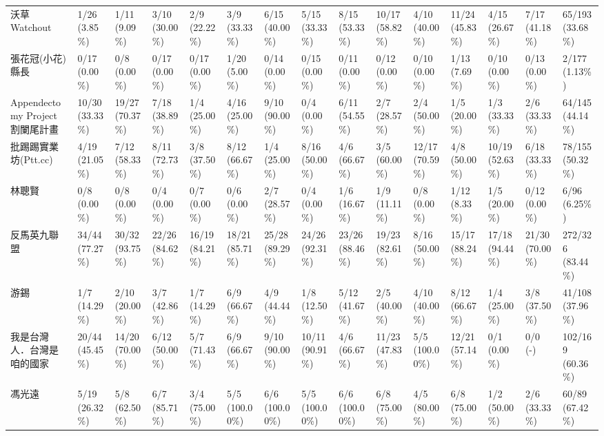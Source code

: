\documentclass[a4paper, 10pt, conference]{ieeeconf}       %
\begin{document}
\begin{CJK}{UTF8}{bsmi}
\begin{landscape}
\begin{longtable}[c]{@{}L{2.45cm}L{1.1cm}L{1.1cm}L{1.1cm}L{1.1cm}L{1.1cm}L{1.1cm}L{1.1cm}L{1.1cm}L{1.1cm}L{1.1cm}L{1.1cm}L{1.1cm}L{1.1cm}L{1.1cm}@{}}
沃草 Watchout & 1/26 (3.85\%) & 1/11 (9.09\%) & 3/10 (30.00\%) & 2/9 (22.22\%) & 3/9 (33.33\%) & 6/15 (40.00\%) & 5/15 (33.33\%) & 8/15 (53.33\%) & 10/17 (58.82\%) & 4/10 (40.00\%) & 11/24 (45.83\%) & 4/15 (26.67\%) & 7/17 (41.18\%) & 65/193 (33.68\%) \\
張花冠(小花)縣長 & 0/17 (0.00\%) & 0/8 (0.00\%) & 0/17 (0.00\%) & 0/17 (0.00\%) & 1/20 (5.00\%) & 0/14 (0.00\%) & 0/15 (0.00\%) & 0/11 (0.00\%) & 0/12 (0.00\%) & 0/10 (0.00\%) & 1/13 (7.69\%) & 0/10 (0.00\%) & 0/13 (0.00\%) & 2/177 (1.13\%) \\
Appendectomy Project 割闌尾計畫 & 10/30 (33.33\%) & 19/27 (70.37\%) & 7/18 (38.89\%) & 1/4 (25.00\%) & 4/16 (25.00\%) & 9/10 (90.00\%) & 0/4 (0.00\%) & 6/11 (54.55\%) & 2/7 (28.57\%) & 2/4 (50.00\%) & 1/5 (20.00\%) & 1/3 (33.33\%) & 2/6 (33.33\%) & 64/145 (44.14\%) \\
批踢踢實業坊(Ptt.cc) & 4/19 (21.05\%) & 7/12 (58.33\%) & 8/11 (72.73\%) & 3/8 (37.50\%) & 8/12 (66.67\%) & 1/4 (25.00\%) & 8/16 (50.00\%) & 4/6 (66.67\%) & 3/5 (60.00\%) & 12/17 (70.59\%) & 4/8 (50.00\%) & 10/19 (52.63\%) & 6/18 (33.33\%) & 78/155 (50.32\%) \\
林聰賢 & 0/8 (0.00\%) & 0/8 (0.00\%) & 0/4 (0.00\%) & 0/7 (0.00\%) & 0/6 (0.00\%) & 2/7 (28.57\%) & 0/4 (0.00\%) & 1/6 (16.67\%) & 1/9 (11.11\%) & 0/8 (0.00\%) & 1/12 (8.33\%) & 1/5 (20.00\%) & 0/12 (0.00\%) & 6/96 (6.25\%) \\
反馬英九聯盟 & 34/44 (77.27\%) & 30/32 (93.75\%) & 22/26 (84.62\%) & 16/19 (84.21\%) & 18/21 (85.71\%) & 25/28 (89.29\%) & 24/26 (92.31\%) & 23/26 (88.46\%) & 19/23 (82.61\%) & 8/16 (50.00\%) & 15/17 (88.24\%) & 17/18 (94.44\%) & 21/30 (70.00\%) & 272/326 (83.44\%) \\
游錫\charkun{} & 1/7 (14.29\%) & 2/10 (20.00\%) & 3/7 (42.86\%) & 1/7 (14.29\%) & 6/9 (66.67\%) & 4/9 (44.44\%) & 1/8 (12.50\%) & 5/12 (41.67\%) & 2/5 (40.00\%) & 4/10 (40.00\%) & 8/12 (66.67\%) & 1/4 (25.00\%) & 3/8 (37.50\%) & 41/108 (37.96\%) \\
我是台灣人．台灣是咱的國家 & 20/44 (45.45\%) & 14/20 (70.00\%) & 6/12 (50.00\%) & 5/7 (71.43\%) & 6/9 (66.67\%) & 9/10 (90.00\%) & 10/11 (90.91\%) & 4/6 (66.67\%) & 11/23 (47.83\%) & 5/5 (100.00\%) & 12/21 (57.14\%) & 0/1 (0.00\%) & 0/0 (-) & 102/169 (60.36\%) \\
馮光遠 & 5/19 (26.32\%) & 5/8 (62.50\%) & 6/7 (85.71\%) & 3/4 (75.00\%) & 5/5 (100.00\%) & 6/6 (100.00\%) & 5/5 (100.00\%) & 6/6 (100.00\%) & 6/8 (75.00\%) & 4/5 (80.00\%) & 6/8 (75.00\%) & 1/2 (50.00\%) & 2/6 (33.33\%) & 60/89 (67.42\%) \\

\end{longtable}
\end{landscape}
\end{CJK}
\end{document}
